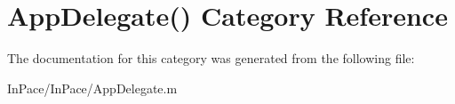 \hypertarget{categoryAppDelegate_07_08}{\section{App\-Delegate() Category Reference}
\label{categoryAppDelegate_07_08}
}


The documentation for this category was generated from the following file\-:\begin{DoxyCompactItemize}
\item 
In\-Pace/\-In\-Pace/App\-Delegate.\-m\end{DoxyCompactItemize}
